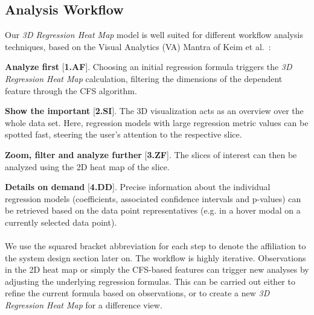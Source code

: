 \documentclass[journal]{style/vgtc} 			          %
\begin{document}
\subsection{Analysis Workflow} \label{sec:Workflow}
\noindent Our \emph{3D Regression Heat Map} model is well suited for different workflow analysis techniques, based on the Visual Analytics (VA) Mantra of Keim et al.~\cite{Keim}:

\textbf{Analyze first} [\textbf{1.AF}]. Choosing an initial regression formula triggers the \emph{3D Regression Heat Map} calculation, filtering the dimensions of the dependent feature through the CFS algorithm.

\textbf{Show the important} [\textbf{2.SI}]. The 3D visualization acts as an overview over the whole data set.
Here, regression models with large regression metric values can be spotted fast, steering the user's attention to the respective slice.

\textbf{Zoom, filter and analyze further} [\textbf{3.ZF}]. The slices of interest can then be analyzed using the 2D heat map of the slice.

\textbf{Details on demand} [\textbf{4.DD}]. Precise information about the individual regression models (coefficients, associated confidence intervals and p-values) can be retrieved based on the data point representatives (e.g. in a hover modal on a currently selected data point).
\\\\
We use the squared bracket abbreviation for each step to denote the affiliation to the system design section later on.
The workflow is highly iterative.
Observations in the 2D heat map or simply the CFS-based features can trigger new analyses by adjusting the underlying regression formulas.
This can be carried out either to refine the current formula based on observations, or to create a new \emph{3D Regression Heat Map} for a difference view.
\end{document}
